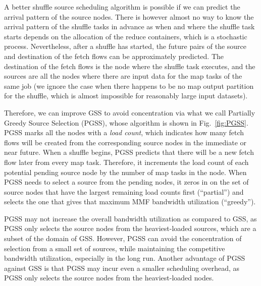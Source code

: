 \documentclass[10pt,journal,compsoc]{IEEEtran}
\begin{document}
A better shuffle source scheduling algorithm is possible if we can
predict the arrival pattern of the source nodes. %
There is however almost no way to know the arrival pattern of the shuffle
tasks in advance
as when and where the shuffle task starts depends on the allocation of
the reduce containers, which is a stochastic process.
Nevertheless, after a shuffle has started, the future pairs of the
source and destination of the fetch flows can be approximately predicted.
The destination of the fetch flows is the node where the shuffle task
executes,
and the sources are all the nodes where there are input data for the
map tasks of the same job
(we ignore the case when there happens to be no map output partition
for the shuffle, which is almost impossible
for reasonably large input datasets). 

Therefore, we can improve GSS to avoid concentration via what we call Partially
Greedy Source Selection (PGSS), whose algorithm is shown in Fig.~\ref{fig:PGSS}.
PGSS marks all the nodes with a \emph{load count}, which indicates how many fetch flows will be created from
the corresponding source nodes in the immediate or near future.
When a shuffle begins, PGSS predicts that there will be a new fetch
flow later from every map task.
Therefore, it increments the load count of each potential pending
source node by the number of map tasks in the node.
When PGSS needs to select a source from the pending nodes, 
it zeros in on the set of source nodes that have the largest remaining load counts first (``partial'') and selects the one that gives that maximum MMF
bandwidth utilization (``greedy'').

PGSS may not increase the overall bandwidth utilization as compared to GSS, 
as PGSS only selects the source nodes from the heaviest-loaded
sources, which are a subset of the domain of GSS.
However, PGSS can avoid the concentration of selection from a small set
of sources,
while maintaining the competitive bandwidth utilization, especially in the long run. 
Another advantage of PGSS against GSS is that PGSS may incur
even a smaller scheduling overhead, 
as PGSS only selects the source nodes from the heaviest-loaded nodes. 
\end{document}
